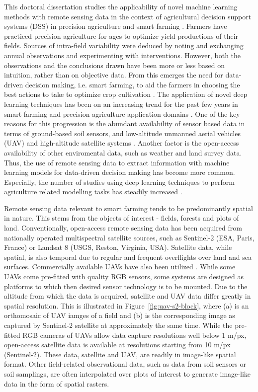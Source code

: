 
This doctoral dissertation studies the applicability of novel machine learning methods with remote sensing data in the context of agricultural decision support systems (DSS) in precision agriculture \cite{Bell1995} and smart farming \cite{Sundmaeker2016}. Farmers have practiced precision agriculture for ages to optimize yield productions of their fields. Sources of intra-field variability were deduced by noting and exchanging annual observations and experimenting with interventions. However, both the observations and the conclusions drawn have been more or less based on intuition, rather than on objective data. From this emerges the need for data-driven decision making, i.e. smart farming, to aid the farmers in choosing the best actions to take to optimize crop cultivation \cite{Kamilaris2017}. The application of novel deep learning techniques has been on an increasing trend for the past few years in smart farming and precision agriculture application domains \cite{VanKlompenburg2020}. One of the key reasons for this progression is the abundant availability of sensor based data in terms of ground-based soil sensors, and low-altitude unmanned aerial vehicles (UAV) and high-altitude satellite systems \cite{Wolfert2017d}. Another factor is the open-access availability of other enviromental data, such as weather and land survey data. Thus, the use of remote sensing data to extract information with machine learning models for data-driven decision making has become more common. Especially, the number of studies using deep learning techniques to perform agriculture related modelling tasks has steadily increased \cite{Kamilaris2018a}. 

Remote sensing data relevant to smart farming tends to be predominantly spatial in nature. This stems from the objects of interest - fields, forests and plots of land. Conventionally, open-access remote sensing data has been acquired from nationally operated multispectral satellite sources, such as Sentinel-2 (ESA, Paris, France) or Landsat 8 (USGS, Reston, Virginia, USA). Satellite data, while spatial, is also temporal due to regular and frequent overflights over land and sea surfaces. Commercially available UAVs have also been utilized \cite{Nasi2017}. While some UAVs come pre-fitted with quality RGB sensors, some systems are designed as platforms to which then desired sensor technology is to be mounted. Due to the altitude from which the data is acquired, satellite and UAV data differ greatly in spatial resolution. This is illustrated in Figure~\ref{fig:uav-s2-block}, where (a) is an orthomosaic of UAV iamges of a field and (b) is the corresponding image as captured by Sentinel-2 satellite at approximately the same time. While the pre-fitted RGB cameras of UAVs allow data capture resolutions well below 1 m/px, open-access satellite data is available at resolutions starting from 10 m/px (Sentinel-2). These data, satellite and UAV, are readily in image-like spatial format. Other field-related observational data, such as data from soil sensors or soil samplings, are often interpolated over plots of interest to generate image-like data in the form of spatial rasters. 

